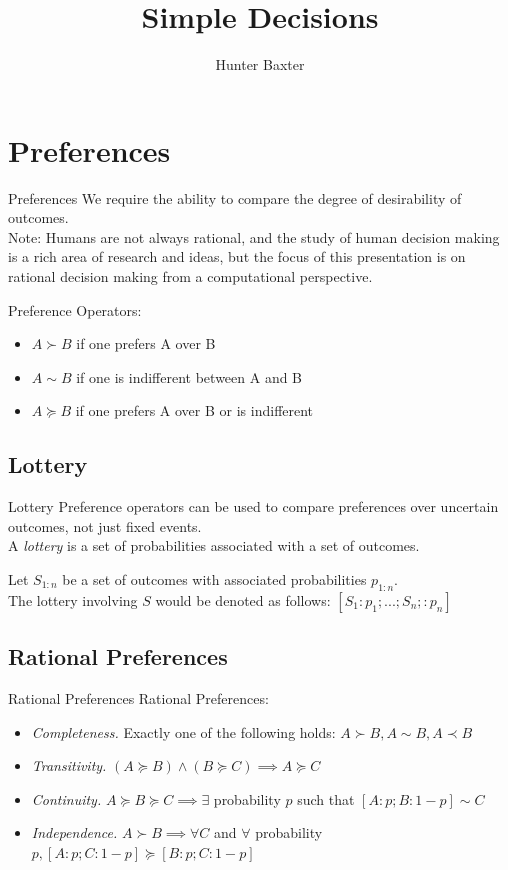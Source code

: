 \documentclass{beamer}
\title{Simple Decisions}
\author{Hunter Baxter}
\begin{document}
\maketitle

\section{Preferences}
\begin{frame}{Preferences}
We require the ability to compare the degree of desirability of outcomes. \\
Note: Humans are not always rational, and the study of human decision making is a rich area of research and ideas, but the focus of this presentation is on rational decision making from a computational perspective. 

Preference Operators:
\begin{itemize}
    \item $A \succ B$ if one prefers A over B
    \item $A \sim B$ if one is indifferent between A and B
    \item $A \succeq B$ if one prefers A over B or is indifferent
\end{itemize}
\end{frame}

\subsection{Lottery}
\begin{frame}{Lottery}
Preference operators can be used to compare preferences over uncertain outcomes, not just fixed events. \\
A \textit{lottery} is a set of probabilities associated with a set of outcomes.

Let $S_{1:n}$ be a set of outcomes with associated probabilities $p_{1:n}$. \\

The lottery involving $S$ would be denoted as follows:
$[S_1:p_1;...;S_n;:p_n]$
\end{frame}

\subsection{Rational Preferences}
\begin{frame}{Rational Preferences}
Rational Preferences:
\begin{itemize}
    \item \textit{Completeness.} Exactly one of the following holds: $A \succ B, A \sim B, A \prec B$
    \item \textit{Transitivity.} $(A \succeq B) \land (B \succeq C) \implies A \succeq C$
    \item \textit{Continuity.} $A \succeq B \succeq C \implies \exists$ probability $p$ such that $[A: p; B: 1-p] \sim C$
    \item \textit{Independence.} $A \succ B \implies \forall C$ and $\forall$ probability $p, [A:p;C:1-p] \succeq [B:p;C:1-p]$
\end{itemize}
\end{frame}
\end{document}
